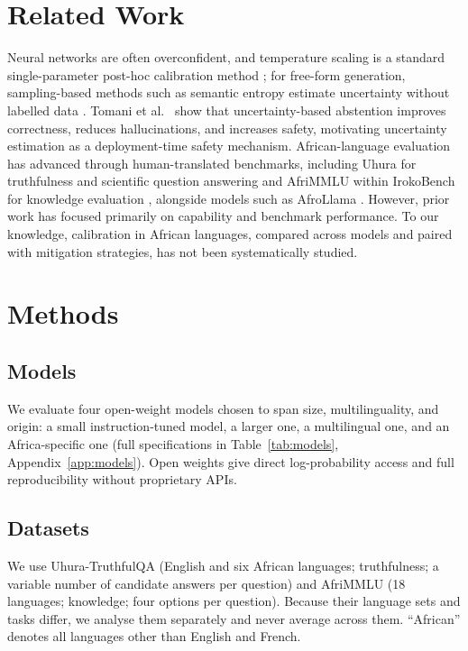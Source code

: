 \documentclass[11pt]{article}
\begin{document}
\section{Related Work}
Neural networks are often overconfident, and temperature scaling is a standard single-parameter
post-hoc calibration method \cite{guo2017}; for free-form generation, sampling-based methods such as
semantic entropy estimate uncertainty without labelled data \cite{kuhn2023}. Tomani et
al.~\cite{tomani2024} show that uncertainty-based abstention improves correctness, reduces
hallucinations, and increases safety, motivating uncertainty estimation as a deployment-time safety
mechanism. African-language evaluation has advanced through human-translated benchmarks, including
Uhura for truthfulness and scientific question answering \cite{uhura} and AfriMMLU within IrokoBench
for knowledge evaluation \cite{irokobench}, alongside models such as AfroLlama \cite{afrollama}.
However, prior work has focused primarily on capability and benchmark performance. To our knowledge,
calibration in African languages, compared across models and paired with mitigation strategies, has
not been systematically studied.

\section{Methods}

\subsection{Models}
We evaluate four open-weight models chosen to span size, multilinguality, and origin: a small
instruction-tuned model, a larger one, a multilingual one, and an Africa-specific one (full
specifications in Table~\ref{tab:models}, Appendix~\ref{app:models}). Open weights give direct
log-probability access and full reproducibility without proprietary APIs.

\subsection{Datasets}
We use Uhura-TruthfulQA \cite{uhura} (English and six African languages; truthfulness; a variable
number of candidate answers per question) and AfriMMLU \cite{irokobench} (18 languages; knowledge;
four options per question). Because their language sets and tasks differ, we analyse them separately
and never average across them. ``African'' denotes all languages other than English and French.
\end{document}
